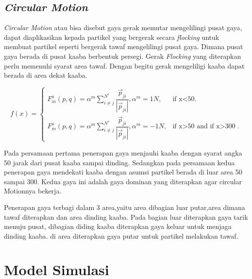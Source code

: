 \subsection{\emph{Circular Motion}}\label{sec:circularmotion}
\hspace{0.5cm}\emph{Circular Motion} atau bisa disebut gaya gerak memutar mengelilingi pusat gaya, dapat diaplikasikan kepada partikel yang bergerak secara \textit{flocking} untuk membuat partikel seperti bergerak tawaf mengelilingi pusat gaya. Dimana pusat gaya berada di pusat kaaba berbentuk persegi. Gerak \textit{Flocking} yang diterapkan perlu memenuhi syarat area tawaf. Dengan begitu gerak mengeliligi kaaba dapat berada di area dekat kaaba.

\[
  f(x)=\begin{cases}
    F_m^a(p,q) = \alpha^m \sum^{N^c}_{i \neq j}\dfrac{\vec{p}_{ji}}{|\vec{p}_{ji}|},\alpha^m = 1N , & \text{if x<50}.\\
    F_m^a(p,q) = \alpha^m \sum^{N^c}_{i \neq j}\dfrac{\vec{p}_{ji}}{|\vec{p}_{ji}|},\alpha^m = -1N, & \text{if x>50 and if x>300 }.
  \end{cases}
\]

\hspace{0.5cm}Pada persamaan pertama penerapan gaya menjauhi kaaba dengan syarat angka 50 jarak dari pusat kaaba sampai dinding. Sedangkan pada persamaan kedua penerapan gaya mendekati kaaba dengan asumsi partikel berada di luar area 50 sampai 300. Kedua gaya ini adalah gaya dominan yang diterapkan agar circular Motionnya bekerja.


\hspace{0.5cm}Penerapan gaya terbagi dalam 3 area,yaitu area dibagian luar putar,area dimana tawaf diterapkan dan area dinding kaaba. Pada bagian luar diterapkan gaya tarik menuju pusat, dibagian diding kaaba diterapkan gaya keluar untuk menjaga dinding kaaba. di area diterapkan gaya putar untuk partikel melakukan tawaf.


\section{Model Simulasi}\label{cha:model simulasi}

